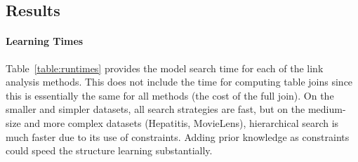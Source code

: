 \documentclass{article}
\begin{document}
%
%


\subsection{Results} 

\paragraph{Learning Times} Table~\ref{table:runtimes}
 provides the model search time for each of the link analysis methods. 
This does not include the time for computing table joins since this is essentially the same for all methods (the cost of the full join). 
On the smaller and simpler datasets, all search strategies are fast, 
but on the medium-size and more complex datasets (Hepatitis, MovieLens), hierarchical search is much faster due to its use of constraints.
Adding prior knowledge as constraints could speed the structure learning substantially.

\end{document}
